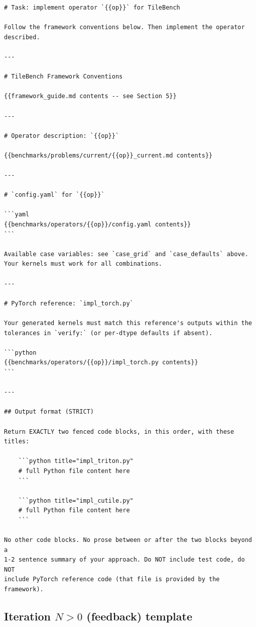 \documentclass[11pt]{article}
\begin{document}
\begin{promptbox}
\begin{verbatim}
# Task: implement operator `{{op}}` for TileBench

Follow the framework conventions below. Then implement the operator
described.

---

# TileBench Framework Conventions

{{framework_guide.md contents -- see Section 5}}

---

# Operator description: `{{op}}`

{{benchmarks/problems/current/{{op}}_current.md contents}}

---

# `config.yaml` for `{{op}}`

```yaml
{{benchmarks/operators/{{op}}/config.yaml contents}}
```

Available case variables: see `case_grid` and `case_defaults` above.
Your kernels must work for all combinations.

---

# PyTorch reference: `impl_torch.py`

Your generated kernels must match this reference's outputs within the
tolerances in `verify:` (or per-dtype defaults if absent).

```python
{{benchmarks/operators/{{op}}/impl_torch.py contents}}
```

---

## Output format (STRICT)

Return EXACTLY two fenced code blocks, in this order, with these titles:

    ```python title="impl_triton.py"
    # full Python file content here
    ```

    ```python title="impl_cutile.py"
    # full Python file content here
    ```

No other code blocks. No prose between or after the two blocks beyond a
1-2 sentence summary of your approach. Do NOT include test code, do NOT
include PyTorch reference code (that file is provided by the framework).
\end{verbatim}
\end{promptbox}

\subsection{Iteration $N > 0$ (feedback) template}
\end{document}
